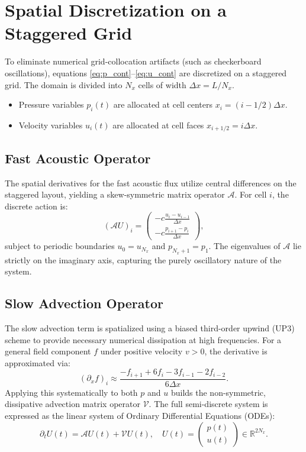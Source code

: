\documentclass[11pt,a4paper]{article}
\begin{document}
\section{Spatial Discretization on a Staggered Grid}
To eliminate numerical grid-collocation artifacts (such as checkerboard oscillations), equations \eqref{eq:p_cont}--\eqref{eq:u_cont} are discretized on a staggered grid. The domain is divided into $N_x$ cells of width $\Delta x = L / N_x$.
\begin{itemize}
    \item Pressure variables $p_i(t)$ are allocated at cell centers $x_i = (i - 1/2)\Delta x$.
    \item Velocity variables $u_i(t)$ are allocated at cell faces $x_{i+1/2} = i\Delta x$.
\end{itemize}

\subsection{Fast Acoustic Operator}
The spatial derivatives for the fast acoustic flux utilize central differences on the staggered layout, yielding a skew-symmetric matrix operator $\mathcal{A}$. For cell $i$, the discrete action is:
\begin{equation}
    (\mathcal{A} U)_i = 
    \begin{pmatrix}
        -c \frac{u_i - u_{i-1}}{\Delta x} \\[0.5em]
        -c \frac{p_{i+1} - p_i}{\Delta x}
    \end{pmatrix},
\end{equation}
subject to periodic boundaries $u_0 = u_{N_x}$ and $p_{N_x+1} = p_1$. The eigenvalues of $\mathcal{A}$ lie strictly on the imaginary axis, capturing the purely oscillatory nature of the system.

\subsection{Slow Advection Operator}
The slow advection term is spatialized using a biased third-order upwind (UP3) scheme to provide necessary numerical dissipation at high frequencies. For a general field component $f$ under positive velocity $v > 0$, the derivative is approximated via:
\begin{equation}
    (\partial_x f)_i \approx \frac{-f_{i+1} + 6f_i - 3f_{i-1} - 2f_{i-2}}{6\Delta x}.
\end{equation}
Applying this systematically to both $p$ and $u$ builds the non-symmetric, dissipative advection matrix operator $\mathcal{V}$. The full semi-discrete system is expressed as the linear system of Ordinary Differential Equations (ODEs):
\begin{equation}
    \partial_t U(t) = \mathcal{A}U(t) + \mathcal{V}U(t), \quad U(t) = \begin{pmatrix} p(t) \\ u(t) \end{pmatrix} \in \mathbb{R}^{2N_x}.
\end{equation}
\end{document}
